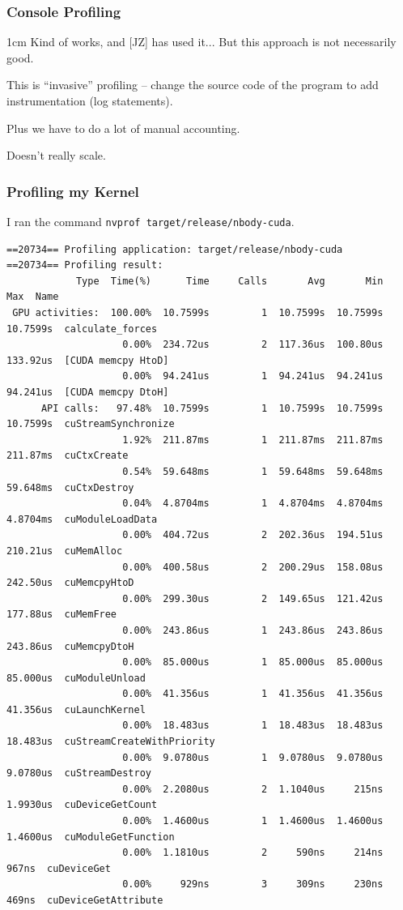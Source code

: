 \begin{frame}
\frametitle{Console Profiling}


\begin{changemargin}{1cm}
Kind of works, and [JZ] has used it... But this approach is not necessarily good.  

This is ``invasive'' profiling -- change the source code of the program to add instrumentation (log statements). 

Plus we have to do a lot of manual accounting.

Doesn't really scale.
\end{changemargin}

\end{frame}

\begin{frame}[fragile]
\frametitle{Profiling my Kernel}

I ran the command \texttt{nvprof target/release/nbody-cuda}.

{\tiny
\begin{verbatim}
==20734== Profiling application: target/release/nbody-cuda
==20734== Profiling result:
            Type  Time(%)      Time     Calls       Avg       Min       Max  Name
 GPU activities:  100.00%  10.7599s         1  10.7599s  10.7599s  10.7599s  calculate_forces
                    0.00%  234.72us         2  117.36us  100.80us  133.92us  [CUDA memcpy HtoD]
                    0.00%  94.241us         1  94.241us  94.241us  94.241us  [CUDA memcpy DtoH]
      API calls:   97.48%  10.7599s         1  10.7599s  10.7599s  10.7599s  cuStreamSynchronize
                    1.92%  211.87ms         1  211.87ms  211.87ms  211.87ms  cuCtxCreate
                    0.54%  59.648ms         1  59.648ms  59.648ms  59.648ms  cuCtxDestroy
                    0.04%  4.8704ms         1  4.8704ms  4.8704ms  4.8704ms  cuModuleLoadData
                    0.00%  404.72us         2  202.36us  194.51us  210.21us  cuMemAlloc
                    0.00%  400.58us         2  200.29us  158.08us  242.50us  cuMemcpyHtoD
                    0.00%  299.30us         2  149.65us  121.42us  177.88us  cuMemFree
                    0.00%  243.86us         1  243.86us  243.86us  243.86us  cuMemcpyDtoH
                    0.00%  85.000us         1  85.000us  85.000us  85.000us  cuModuleUnload
                    0.00%  41.356us         1  41.356us  41.356us  41.356us  cuLaunchKernel
                    0.00%  18.483us         1  18.483us  18.483us  18.483us  cuStreamCreateWithPriority
                    0.00%  9.0780us         1  9.0780us  9.0780us  9.0780us  cuStreamDestroy
                    0.00%  2.2080us         2  1.1040us     215ns  1.9930us  cuDeviceGetCount
                    0.00%  1.4600us         1  1.4600us  1.4600us  1.4600us  cuModuleGetFunction
                    0.00%  1.1810us         2     590ns     214ns     967ns  cuDeviceGet
                    0.00%     929ns         3     309ns     230ns     469ns  cuDeviceGetAttribute
\end{verbatim}
}

\end{frame}


